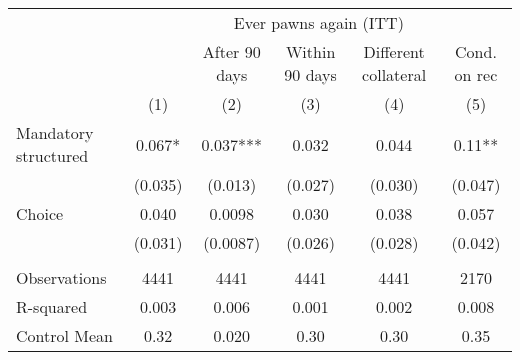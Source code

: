 \begin{tabular}{lccccc}
\toprule
      & \multicolumn{5}{c}{Ever pawns again (ITT)} \\
\cmidrule{2-6}      &       & After 90 days & Within 90 days & Different collateral & Cond. on rec \\
\midrule
\midrule
      & (1)   & (2)   & (3)   & (4)   & (5) \\
\midrule
\midrule
Mandatory structured & 0.067* & 0.037*** & 0.032 & 0.044 & 0.11** \\
      & (0.035) & (0.013) & (0.027) & (0.030) & (0.047) \\
Choice  & 0.040 & 0.0098 & 0.030 & 0.038 & 0.057 \\
      & (0.031) & (0.0087) & (0.026) & (0.028) & (0.042) \\
      &       &       &       &       &  \\
\midrule
Observations & 4441  & 4441  & 4441  & 4441  & 2170 \\
R-squared & 0.003 & 0.006 & 0.001 & 0.002 & 0.008 \\
Control Mean & 0.32  & 0.020 & 0.30  & 0.30  & 0.35 \\
\bottomrule
\bottomrule
\end{tabular}%
